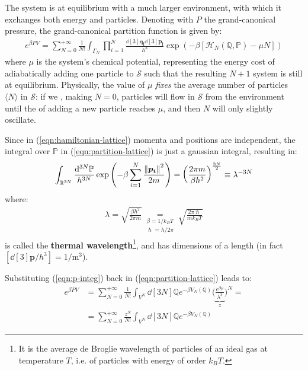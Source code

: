 \documentclass[../../main.tex]{subfiles}
\begin{document}
The system is at equilibrium with a much larger environment, with which it exchanges both energy and particles. Denoting with $P$ the grand-canonical pressure, the grand-canonical partition function is given by:
\begin{align}\label{eqn:partition-lattice}
    e^{\beta P V} = \sum_{N=0}^{+\infty} \frac{1}{N!} \int_{\Gamma_N} \prod_{i=1}^N \frac{\dd[3]{\bm{q_i}} \dd[3]{\bm{p_i}}}{h^3} \exp(-\beta[ \mathcal{H}_N(\mathbb{Q}, \mathbb{P}) - \mu N])  
\end{align}
where $\mu$ is the system's chemical potential, representing the energy cost of adiabatically adding one particle to $\mathcal{S}$ such that the resulting $N+1$ system is still at equilibrium. Physically, the value of $\mu$ \textit{fixes} the average number of particles $\langle N \rangle$ in $\mathcal{S}$: if we , making $N=0$, particles will flow in $\mathcal{S}$ from the environment until the  of adding a new particle reaches $\mu$, and then $N$ will only slightly oscillate.

\medskip

Since in (\ref{eqn:hamiltonian-lattice}) momenta and positions are independent, the integral over $\mathbb{P}$ in (\ref{eqn:partition-lattice}) is just a gaussian integral, resulting in:
\begin{align}\label{eqn:p-integ}
    \int_{\mathbb{R}^{3N}} \frac{\dd[3N]{\mathbb{P}}}{h^{3N}} \exp\left(-\beta\sum_{i=1}^N \frac{\norm{\bm{p_i}}^2}{2m} \right) = \left(\frac{2\pi m}{\beta h^2} \right)^{\frac{3N}{2}} \equiv \lambda^{-3N}
\end{align}
where:
\begin{align*}
    \lambda=\sqrt{\frac{\beta h^2}{2 \pi m}} \underset{\substack{\beta = 1/k_B T\\\hslash = h/2 \pi}}{=} \sqrt{\frac{2 \pi \hslash}{m k_B T}}
\end{align*}
is called the \textbf{thermal wavelength}\footnote{It is the average de Broglie wavelength of particles of an ideal gas at temperature $T$, i.e. of particles with energy of order $k_B T$.}, and has dimensions of a length (in fact $[\dd[3]{\bm{p}}/h^3] = 1/\si{\m^3}$). 

\medskip

Substituting (\ref{eqn:p-integ}) back in (\ref{eqn:partition-lattice}) leads to:
\begin{align}\nonumber
    e^{\beta P V} &= \sum_{N=0}^{+\infty} \frac{1}{N!} \int_{V^N} \dd[3N]{\mathbb{Q}} e^{-\beta V_N(\mathbb{Q})} \Bigg(\underbrace{\frac{e^{\beta \mu }}{\lambda^3}}_{z} \Bigg)^N =\\
    &= \sum_{N=0}^{+\infty}  \frac{z^N}{N!} \int_{V^N} \dd[3N]{\mathbb{Q}} e^{-\beta V_N(\mathbb{Q})}   \label{eqn:part-func}
\end{align}
\end{document}

